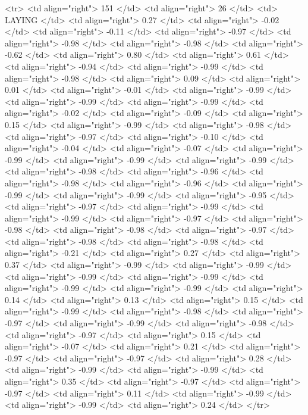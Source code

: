   <tr> <td align="right"> 151 </td> <td align="right">  26 </td> <td> LAYING </td> <td align="right"> 0.27 </td> <td align="right"> -0.02 </td> <td align="right"> -0.11 </td> <td align="right"> -0.97 </td> <td align="right"> -0.98 </td> <td align="right"> -0.98 </td> <td align="right"> -0.62 </td> <td align="right"> 0.80 </td> <td align="right"> 0.61 </td> <td align="right"> -0.94 </td> <td align="right"> -0.99 </td> <td align="right"> -0.98 </td> <td align="right"> 0.09 </td> <td align="right"> 0.01 </td> <td align="right"> -0.01 </td> <td align="right"> -0.99 </td> <td align="right"> -0.99 </td> <td align="right"> -0.99 </td> <td align="right"> -0.02 </td> <td align="right"> -0.09 </td> <td align="right"> 0.15 </td> <td align="right"> -0.99 </td> <td align="right"> -0.98 </td> <td align="right"> -0.97 </td> <td align="right"> -0.10 </td> <td align="right"> -0.04 </td> <td align="right"> -0.07 </td> <td align="right"> -0.99 </td> <td align="right"> -0.99 </td> <td align="right"> -0.99 </td> <td align="right"> -0.98 </td> <td align="right"> -0.96 </td> <td align="right"> -0.98 </td> <td align="right"> -0.96 </td> <td align="right"> -0.99 </td> <td align="right"> -0.99 </td> <td align="right"> -0.95 </td> <td align="right"> -0.97 </td> <td align="right"> -0.99 </td> <td align="right"> -0.99 </td> <td align="right"> -0.97 </td> <td align="right"> -0.98 </td> <td align="right"> -0.98 </td> <td align="right"> -0.97 </td> <td align="right"> -0.98 </td> <td align="right"> -0.98 </td> <td align="right"> -0.21 </td> <td align="right"> 0.27 </td> <td align="right"> 0.37 </td> <td align="right"> -0.99 </td> <td align="right"> -0.99 </td> <td align="right"> -0.99 </td> <td align="right"> -0.99 </td> <td align="right"> -0.99 </td> <td align="right"> -0.99 </td> <td align="right"> 0.14 </td> <td align="right"> 0.13 </td> <td align="right"> 0.15 </td> <td align="right"> -0.99 </td> <td align="right"> -0.98 </td> <td align="right"> -0.97 </td> <td align="right"> -0.99 </td> <td align="right"> -0.98 </td> <td align="right"> -0.97 </td> <td align="right"> 0.15 </td> <td align="right"> -0.07 </td> <td align="right"> 0.21 </td> <td align="right"> -0.97 </td> <td align="right"> -0.97 </td> <td align="right"> 0.28 </td> <td align="right"> -0.99 </td> <td align="right"> -0.99 </td> <td align="right"> 0.35 </td> <td align="right"> -0.97 </td> <td align="right"> -0.97 </td> <td align="right"> 0.11 </td> <td align="right"> -0.99 </td> <td align="right"> -0.99 </td> <td align="right"> 0.24 </td> </tr>
